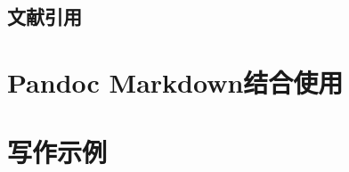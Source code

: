 \documentclass[12pt, blue]{uglynote}
\begin{document}
\subsection{文献引用}


\section{Pandoc Markdown结合使用}



\section{写作示例}



\printbibliography[
  title=\ebibname]

\appendix
\addappheadtotoc
\end{document}
